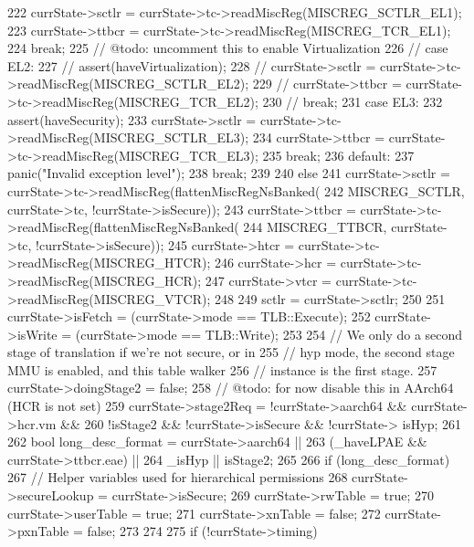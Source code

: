 \begin{DoxyCode}
{{{222             currState->sctlr = currState->tc->readMiscReg(MISCREG_SCTLR_EL1);
223             currState->ttbcr = currState->tc->readMiscReg(MISCREG_TCR_EL1);
224             break;
225           // @todo: uncomment this to enable Virtualization
226           // case EL2:
227           //   assert(haveVirtualization);
228           //   currState->sctlr = currState->tc->readMiscReg(MISCREG_SCTLR_EL2);
229           //   currState->ttbcr = currState->tc->readMiscReg(MISCREG_TCR_EL2);
230           //   break;
231           case EL3:
232             assert(haveSecurity);
233             currState->sctlr = currState->tc->readMiscReg(MISCREG_SCTLR_EL3);
234             currState->ttbcr = currState->tc->readMiscReg(MISCREG_TCR_EL3);
235             break;
236           default:
237             panic("Invalid exception level");
238             break;
239         }
240     } else {
241         currState->sctlr = currState->tc->readMiscReg(flattenMiscRegNsBanked(
242             MISCREG_SCTLR, currState->tc, !currState->isSecure));
243         currState->ttbcr = currState->tc->readMiscReg(flattenMiscRegNsBanked(
244             MISCREG_TTBCR, currState->tc, !currState->isSecure));
245         currState->htcr  = currState->tc->readMiscReg(MISCREG_HTCR);
246         currState->hcr   = currState->tc->readMiscReg(MISCREG_HCR);
247         currState->vtcr  = currState->tc->readMiscReg(MISCREG_VTCR);
248     }
249     sctlr = currState->sctlr;
250 
251     currState->isFetch = (currState->mode == TLB::Execute);
252     currState->isWrite = (currState->mode == TLB::Write);
253 
254     // We only do a second stage of translation if we're not secure, or in
255     // hyp mode, the second stage MMU is enabled, and this table walker
256     // instance is the first stage.
257     currState->doingStage2 = false;
258     // @todo: for now disable this in AArch64 (HCR is not set)
259     currState->stage2Req = !currState->aarch64 && currState->hcr.vm &&
260                            !isStage2 && !currState->isSecure && !currState->
      isHyp;
261 
262     bool long_desc_format = currState->aarch64 ||
263                             (_haveLPAE && currState->ttbcr.eae) ||
264                             _isHyp || isStage2;
265 
266     if (long_desc_format) {
267         // Helper variables used for hierarchical permissions
268         currState->secureLookup = currState->isSecure;
269         currState->rwTable = true;
270         currState->userTable = true;
271         currState->xnTable = false;
272         currState->pxnTable = false;
273     }
274 
275     if (!currState->timing) {
}}
\end{DoxyCode}
